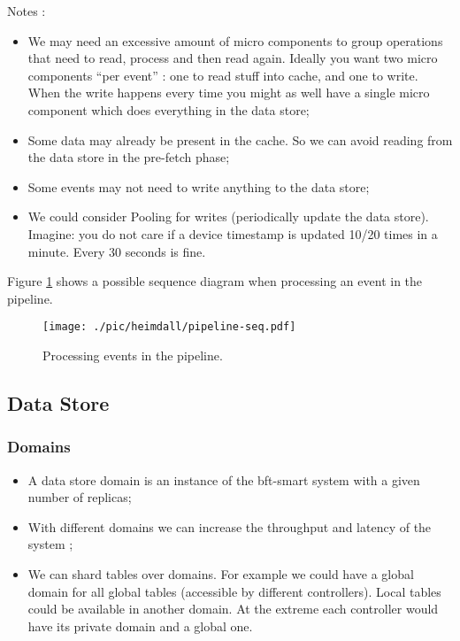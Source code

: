 Notes : 
\begin{itemize}
\item We may need an excessive amount of micro components to group operations that need to read, process and then read again. Ideally you want two micro components ``per event'' : one to read stuff into cache, and one to write. When the write happens every time you might as well have a single micro component which does everything in the data store; 
\item Some data may already be present in the cache. So we can avoid reading from the data store in the pre-fetch phase;
\item Some events may not need to write anything to the data store;
\item We could consider Pooling for writes (periodically  update the data store). Imagine: you do not care if a device timestamp is updated 10/20 times in a minute. Every 30 seconds is fine.  
\end{itemize}

Figure \ref{fig:pipeline-seq} shows a possible sequence diagram when processing an event in the pipeline. 

\begin{figure}[ht]
  \centering
  \texttt{[image: ./pic/heimdall/pipeline-seq.pdf]}
  \caption{Processing events in the pipeline. }
  \label{fig:pipeline-seq}
\end{figure}


\subsection{Data Store}

\subsubsection{Domains}
\begin{itemize}
\item A data store domain is an instance of the bft-smart system with a given number of replicas;
\item With different domains we can increase the throughput and latency of the system ; 
\item We can shard tables over domains. For example we could have a global domain for all global tables (accessible by different controllers). Local tables could be available in another domain. At the extreme each controller would have its private domain and a global one. 
\end{itemize}

